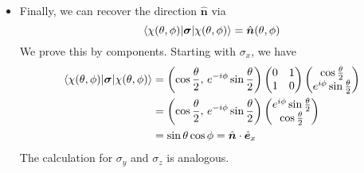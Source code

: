 \documentclass[11pt, a4paper]{article}
\renewcommand{\vec}[1]{\bm{#1}}  %
\newcommand{\uvec}[1]{\hat{\vec{#1}}}  %
\begin{document}
\begin{itemize}
	\item Finally, we can recover the direction $ \uvec{n} $ via
	\begin{equation*}
		\mel{\chi(\theta, \phi)}{\vec{\sigma}}{\chi(\theta, \phi)} = \uvec{n}(\theta, \phi)
	\end{equation*}
	We prove this by components. Starting with $ \sigma_{x} $, we have
	\begin{align*}
		\mel{\chi(\theta, \phi)}{\vec{\sigma}}{\chi(\theta, \phi)} &= \left(\cos\frac{\theta}{2}, \, e^{-i\phi}\sin \frac{\theta}{2}\right)
		\begin{pmatrix}
			0 & 1\\
			1 & 0
		\end{pmatrix}
		\begin{pmatrix}
			\cos \frac{\theta}{2}\\
			e^{i\phi}\sin \frac{\theta}{2}
		\end{pmatrix}\\
		& = \left(\cos\frac{\theta}{2}, \, e^{-i\phi}\sin \frac{\theta}{2}\right)
		\begin{pmatrix}
			e^{i\phi}\sin \frac{\theta}{2}\\
			\cos \frac{\theta}{2}
		\end{pmatrix}\\
		& = \sin \theta \cos \phi = \uvec{n}\cdot \uvec{e}_{x}
	\end{align*}
	The calculation for $ \sigma_{y} $ and $ \sigma_{z} $ is analogous.
	
\end{itemize}
\end{document}
